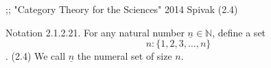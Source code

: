 
;; "Category Theory for the Sciences" 2014 Spivak (2.4)

Notation 2.1.2.21.
For any natural number $\underline{n} \in \mathbb{N}$,
define a set
  $$ n : \{1, 2, 3, \dots , n \} $$.      (2.4)
We call $\underline{n}$ the numeral set of size $n$.
